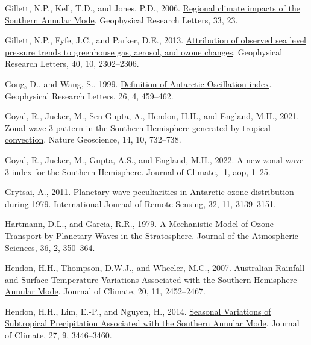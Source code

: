 \documentclass[12pt,oneside]{reedthesis}
\newlength{\cslhangindent}
\newenvironment{CSLReferences}[2] %
 {%
  \setlength{\parindent}{0pt}
  \ifodd #1 \everypar{\setlength{\hangindent}{\cslhangindent}}\ignorespaces\fi
  \ifnum #2 > 0
  \setlength{\parskip}{#2\baselineskip}
  \fi
 }%
 {}
\begin{document}
\begin{CSLReferences}{1}{0}
\leavevmode{}%
Gillett, N.P., Kell, T.D., and Jones, P.D., 2006. \href{https://doi.org/10.1029/2006GL027721}{Regional climate impacts of the {Southern Annular Mode}}. Geophysical Research Letters, 33, 23.

\leavevmode{}%
Gillett, N.P., Fyfe, J.C., and Parker, D.E., 2013. \href{https://doi.org/10.1002/grl.50500}{Attribution of observed sea level pressure trends to greenhouse gas, aerosol, and ozone changes}. Geophysical Research Letters, 40, 10, 2302--2306.

\leavevmode{}%
Gong, D., and Wang, S., 1999. \href{https://doi.org/10.1029/1999GL900003}{Definition of {Antarctic Oscillation} index}. Geophysical Research Letters, 26, 4, 459--462.

\leavevmode{}%
Goyal, R., Jucker, M., Sen Gupta, A., Hendon, H.H., and England, M.H., 2021. \href{https://doi.org/10.1038/s41561-021-00811-3}{Zonal wave 3 pattern in the {Southern Hemisphere} generated by tropical convection}. Nature Geoscience, 14, 10, 732--738.

\leavevmode{}%
Goyal, R., Jucker, M., Gupta, A.S., and England, M.H., 2022. A new zonal wave 3 index for the {Southern Hemisphere}. Journal of Climate, -1, aop, 1--25.

\leavevmode{}%
Grytsai, A., 2011. \href{https://doi.org/10.1080/01431161.2010.541518}{Planetary wave peculiarities in {Antarctic} ozone distribution during 1979}. International Journal of Remote Sensing, 32, 11, 3139--3151.

\leavevmode{}%
Hartmann, D.L., and Garcia, R.R., 1979. \href{https://doi.org/10.1175/1520-0469(1979)036\%3C0350:AMMOOT\%3E2.0.CO;2}{A {Mechanistic Model} of {Ozone Transport} by {Planetary Waves} in the {Stratosphere}}. Journal of the Atmospheric Sciences, 36, 2, 350--364.

\leavevmode{}%
Hendon, H.H., Thompson, D.W.J., and Wheeler, M.C., 2007. \href{https://doi.org/10.1175/JCLI4134.1}{Australian {Rainfall} and {Surface Temperature Variations Associated} with the {Southern Hemisphere Annular Mode}}. Journal of Climate, 20, 11, 2452--2467.

\leavevmode{}%
Hendon, H.H., Lim, E.-P., and Nguyen, H., 2014. \href{https://doi.org/10.1175/JCLI-D-13-00550.1}{Seasonal {Variations} of {Subtropical Precipitation Associated} with the {Southern Annular Mode}}. Journal of Climate, 27, 9, 3446--3460.


\end{CSLReferences}
\end{document}
